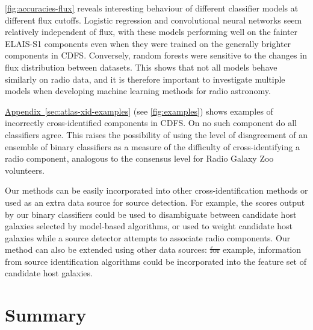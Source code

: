 \documentclass[11pt, a4paper]{book}
\newcommand{\aref}[1]{\hyperref[#1]{Appendix~\ref{#1}}}
\providecommand{\DIFaddtex}[1]{{\protect\color{blue}\uwave{#1}}} %
\providecommand{\DIFdeltex}[1]{{\protect\color{red}\sout{#1}}}                      %
\providecommand{\DIFaddbegin}{} %
\providecommand{\DIFaddend}{} %
\providecommand{\DIFdelbegin}{} %
\providecommand{\DIFdelend}{} %
\providecommand{\DIFadd}[1]{\texorpdfstring{\DIFaddtex{#1}}{#1}} %
\providecommand{\DIFdel}[1]{\texorpdfstring{\DIFdeltex{#1}}{}} %
\newcommand{\DIFscaledelfig}{0.5}
\newlength{\DIFdelgraphicswidth} %
\newlength{\DIFdelgraphicsheight} %
\newcommand{\DIFaddincludegraphics}[2][]{{\color{blue}\fbox{\DIFOincludegraphics[#1]{#2}}}} %
\newcommand{\DIFdelincludegraphics}[2][]{%
\sbox{\DIFdelgraphicsbox}{\DIFOincludegraphics[#1]{#2}}%
\settoboxwidth{\DIFdelgraphicswidth}{\DIFdelgraphicsbox} %
\settoboxtotalheight{\DIFdelgraphicsheight}{\DIFdelgraphicsbox} %
\scalebox{\DIFscaledelfig}{%
\parbox[b]{\DIFdelgraphicswidth}{\usebox{\DIFdelgraphicsbox}\\[-\baselineskip] \rule{\DIFdelgraphicswidth}{0em}}\llap{\resizebox{\DIFdelgraphicswidth}{\DIFdelgraphicsheight}{%
\setlength{\unitlength}{\DIFdelgraphicswidth}%
\begin{picture}(1,1)%
\thicklines\linethickness{2pt} %
{\color[rgb]{1,0,0}\put(0,0){\framebox(1,1){}}}%
{\color[rgb]{1,0,0}\put(0,0){\line( 1,1){1}}}%
{\color[rgb]{1,0,0}\put(0,1){\line(1,-1){1}}}%
\end{picture}%
}\hspace*{3pt}}} %
} %
\DeclareRobustCommand{\DIFaddbegin}{\DIFOaddbegin \let\includegraphics\DIFaddincludegraphics} %
\DeclareRobustCommand{\DIFaddend}{\DIFOaddend \let\includegraphics\DIFOincludegraphics} %
\DeclareRobustCommand{\DIFdelbegin}{\DIFOdelbegin \let\includegraphics\DIFdelincludegraphics} %
\DeclareRobustCommand{\DIFdelend}{\DIFOaddend \let\includegraphics\DIFOincludegraphics} %
\begin{document}
  \autoref{fig:accuracies-flux} reveals interesting behaviour of different
  classifier models at different flux cutoffs. Logistic regression and
  convolutional neural networks seem relatively independent of flux, with
  these models performing well on the fainter ELAIS-S1 components even when
  they were trained on the generally brighter components in CDFS. Conversely,
  random forests were sensitive to the changes in flux distribution between
  datasets. This shows that not all models behave similarly on radio data,
  and it is therefore important to investigate multiple models when
  developing machine learning methods for radio astronomy.

  {\aref{sec:atlas-xid-examples} (see \autoref{fig:examples}) shows examples of incorrectly cross-identified
  components in CDFS. On no such component do all classifiers agree.
  This raises the possibility of using the level of disagreement of an
  ensemble of binary classifiers as a measure of the difficulty of cross-identifying a radio component,
  analogous to the consensus level for Radio Galaxy Zoo volunteers.}

  Our methods can be easily incorporated into other cross-identification
  methods or used as an extra data source for source detection. For
  example, the scores output by our binary classifiers could be used to
  disambiguate between candidate host
  galaxies selected by model-based algorithms, or used to weight candidate
  host galaxies while a source detector attempts to associate radio
  components. Our method can also be extended using other data sources: \DIFdelbegin \DIFdel{for
  }\DIFdelend \DIFaddbegin \DIFadd{For
  }\DIFaddend example, information from source identification algorithms could be
  incorporated into the feature set of candidate host galaxies.

\section{Summary}
\end{document}
